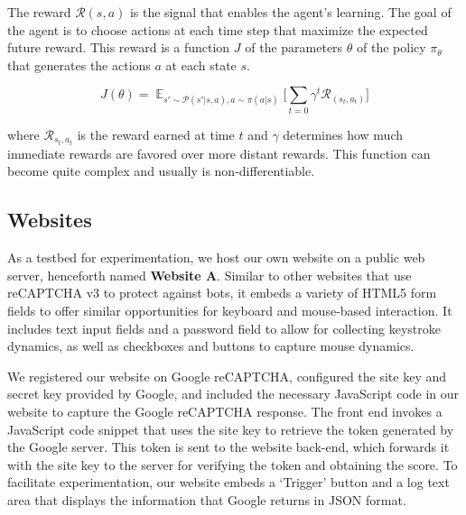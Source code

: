 The reward $\mathcal{R}(s,a)$ is the signal that enables the agent's learning.
The goal of the agent is to choose actions at each time step that maximize the expected future reward.
This reward is a function $J$ of the parameters $\theta$ of the policy $\pi _{\theta}$ that generates the actions $a$ at each state $s$.

\begin{equation}
J(\theta)=\mathop{\mathbb{E}}_{s'\sim \mathcal{P}(s'|s,a), a\sim \pi (a|s)}\bigg[\sum _{t=0}\gamma ^{t}\mathcal{R}_(s_t, a_t)\bigg]
\end{equation}

where $\mathcal{R}_{s_t, a_t}$ is the reward earned at time $t$ and $\gamma$ determines how much immediate rewards are favored over more distant rewards.
This function can become quite complex and usually is non-differentiable.

\subsection{Websites}

As a testbed for experimentation, we host our own website on a public web server, henceforth named \textbf{Website A}.
Similar to other websites that use reCAPTCHA v3 to protect against bots, it embeds a variety of HTML5 form fields to offer similar opportunities for keyboard and mouse-based interaction.
It includes text input fields and a password field to allow for collecting keystroke dynamics, as well as checkboxes and buttons to capture mouse dynamics.

We registered our website on Google reCAPTCHA, configured the site key and secret key provided by Google, and included the necessary JavaScript code in our website to capture the Google reCAPTCHA response.
The front end invokes a JavaScript code snippet that uses the site key to retrieve the token generated by the Google server.
This token is sent to the website back-end, which forwards it with the site key to the server for verifying the token and obtaining the score.
To facilitate experimentation, our website embeds a `Trigger' button and a log text area that displays the information that Google returns in JSON format.


